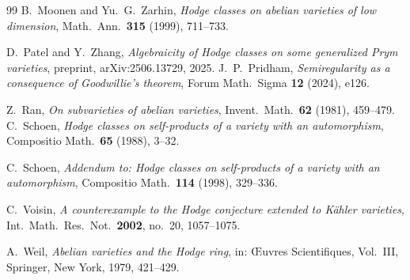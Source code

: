 \documentclass[11pt]{amsart}
\theoremstyle{definition}
\theoremstyle{remark}
\begin{document}
\begin{thebibliography}{99}
 B.~Moonen and Yu.~G.~Zarhin, \emph{Hodge classes on abelian
varieties of low dimension}, Math.\ Ann.\ \textbf{315} (1999), 711--733.

 D.~Patel and Y.~Zhang, \emph{Algebraicity of Hodge classes
on some generalized Prym varieties}, preprint, arXiv:2506.13729, 2025.
 J.~P.~Pridham, \emph{Semiregularity as a consequence of
Goodwillie's theorem}, Forum Math.\ Sigma \textbf{12} (2024), e126.

 Z.~Ran, \emph{On subvarieties of abelian varieties},
Invent.\ Math.\ \textbf{62} (1981), 459--479.
 C.~Schoen, \emph{Hodge classes on self-products of a variety
with an automorphism}, Compositio Math.\ \textbf{65} (1988), 3--32.

 C.~Schoen, \emph{Addendum to: Hodge classes on
self-products of a variety with an automorphism}, Compositio Math.\
\textbf{114} (1998), 329--336.

 C.~Voisin, \emph{A counterexample to the Hodge conjecture
extended to K\"ahler varieties}, Int.\ Math.\ Res.\ Not.\ \textbf{2002},
no.~20, 1057--1075.

 A.~Weil, \emph{Abelian varieties and the Hodge ring},
in: \OE uvres Scientifiques, Vol.~III, Springer, New York, 1979,
421--429.

\end{thebibliography}
\end{document}
